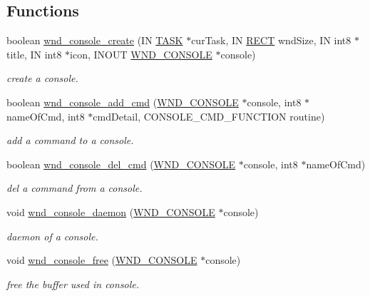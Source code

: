 \subsection*{Functions}
\begin{DoxyCompactItemize}
\item 
boolean \hyperlink{group__console_gaeb190f8bbb3304aa604e69ad66276eab}{wnd\+\_\+console\+\_\+create} (I\+N \hyperlink{struct_t_a_s_k}{T\+A\+S\+K} $\ast$cur\+Task, I\+N \hyperlink{struct_r_e_c_t}{R\+E\+C\+T} wnd\+Size, I\+N int8 $\ast$title, I\+N int8 $\ast$icon, I\+N\+O\+U\+T \hyperlink{struct_w_n_d___c_o_n_s_o_l_e}{W\+N\+D\+\_\+\+C\+O\+N\+S\+O\+L\+E} $\ast$console)
\begin{DoxyCompactList}\small\item\em create a console. \end{DoxyCompactList}\item 
boolean \hyperlink{group__console_ga9d11f62ec412e269ceda6b3ea8b74d5b}{wnd\+\_\+console\+\_\+add\+\_\+cmd} (\hyperlink{struct_w_n_d___c_o_n_s_o_l_e}{W\+N\+D\+\_\+\+C\+O\+N\+S\+O\+L\+E} $\ast$console, int8 $\ast$name\+Of\+Cmd, int8 $\ast$cmd\+Detail, C\+O\+N\+S\+O\+L\+E\+\_\+\+C\+M\+D\+\_\+\+F\+U\+N\+C\+T\+I\+O\+N routine)
\begin{DoxyCompactList}\small\item\em add a command to a console. \end{DoxyCompactList}\item 
boolean \hyperlink{group__console_ga303200d087e0d4b5f3118fb29f11a391}{wnd\+\_\+console\+\_\+del\+\_\+cmd} (\hyperlink{struct_w_n_d___c_o_n_s_o_l_e}{W\+N\+D\+\_\+\+C\+O\+N\+S\+O\+L\+E} $\ast$console, int8 $\ast$name\+Of\+Cmd)
\begin{DoxyCompactList}\small\item\em del a command from a console. \end{DoxyCompactList}\item 
void \hyperlink{group__console_ga0117cb75760ad806b358dea1542ca1c2}{wnd\+\_\+console\+\_\+daemon} (\hyperlink{struct_w_n_d___c_o_n_s_o_l_e}{W\+N\+D\+\_\+\+C\+O\+N\+S\+O\+L\+E} $\ast$console)
\begin{DoxyCompactList}\small\item\em daemon of a console. \end{DoxyCompactList}\item 
void \hyperlink{group__console_ga9540e729abaa101668baf627e70ef797}{wnd\+\_\+console\+\_\+free} (\hyperlink{struct_w_n_d___c_o_n_s_o_l_e}{W\+N\+D\+\_\+\+C\+O\+N\+S\+O\+L\+E} $\ast$console)
\begin{DoxyCompactList}\small\item\em free the buffer used in console. \end{DoxyCompactList}\item 

\end{DoxyCompactItemize}
